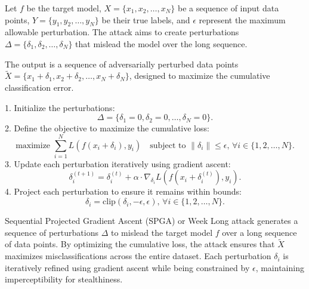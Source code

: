 Let \( f \) be the target model, \( X = \{x_1, x_2, \ldots, x_N\} \) be a sequence of input data points, \( Y = \{y_1, y_2, \ldots, y_N\} \) be their true labels, and \( \epsilon \) represent the maximum allowable perturbation. The attack aims to create perturbations \( \Delta = \{\delta_1, \delta_2, \ldots, \delta_N\} \) that mislead the model over the long sequence.

The output is a sequence of adversarially perturbed data points \( \tilde{X} = \{x_1 + \delta_1, x_2 + \delta_2, \ldots, x_N + \delta_N\} \), designed to maximize the cumulative classification error.

1. Initialize the perturbations:
   \[
   \Delta = \{\delta_1 = 0, \delta_2 = 0, \ldots, \delta_N = 0\}.
   \]
2. Define the objective to maximize the cumulative loss:
   \[
   \text{maximize } \sum_{i=1}^{N} L(f(x_i + \delta_i), y_i) \quad \text{subject to } \|\delta_i\| \leq \epsilon, \, \forall i \in \{1, 2, \ldots, N\}.
   \]
3. Update each perturbation iteratively using gradient ascent:
   \[
   \delta_i^{(t+1)} = \delta_i^{(t)} + \alpha \cdot \nabla_{\delta_i} L(f(x_i + \delta_i^{(t)}), y_i).
   \]
4. Project each perturbation to ensure it remains within bounds:
   \[
   \delta_i = \text{clip}(\delta_i, -\epsilon, \epsilon), \, \forall i \in \{1, 2, \ldots, N\}.
   \]

Sequential Projected Gradient Ascent (SPGA) or Week Long attack generates a sequence of perturbations \( \Delta \) to mislead the target model \( f \) over a long sequence of data points. By optimizing the cumulative loss, the attack ensures that \( \tilde{X} \) maximizes misclassifications across the entire dataset. Each perturbation \( \delta_i \) is iteratively refined using gradient ascent while being constrained by \( \epsilon \), maintaining imperceptibility for stealthiness.